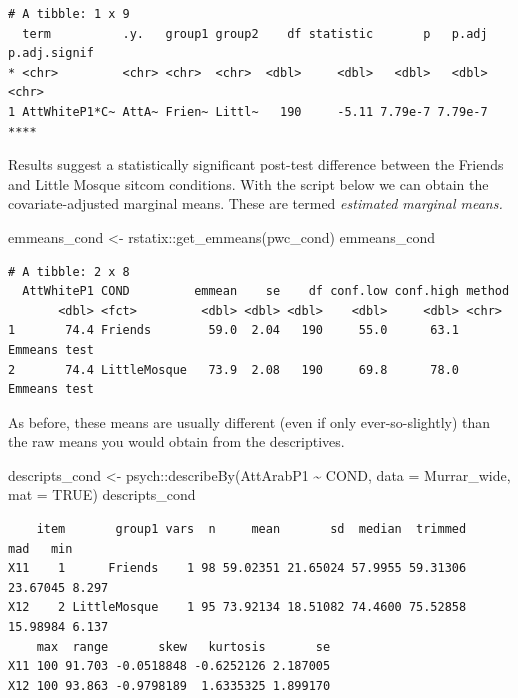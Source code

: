 \documentclass[
  11pt,
]{book}
\newenvironment{Shaded}{\begin{snugshade}}{\end{snugshade}}
\newcommand{\AttributeTok}[1]{\textcolor[rgb]{0.77,0.63,0.00}{#1}}
\newcommand{\ConstantTok}[1]{\textcolor[rgb]{0.00,0.00,0.00}{#1}}
\newcommand{\FunctionTok}[1]{\textcolor[rgb]{0.00,0.00,0.00}{#1}}
\newcommand{\NormalTok}[1]{#1}
\newcommand{\OtherTok}[1]{\textcolor[rgb]{0.56,0.35,0.01}{#1}}
\newcommand{\SpecialCharTok}[1]{\textcolor[rgb]{0.00,0.00,0.00}{#1}}
\begin{document}
\begin{verbatim}
# A tibble: 1 x 9
  term          .y.   group1 group2    df statistic       p   p.adj p.adj.signif
* <chr>         <chr> <chr>  <chr>  <dbl>     <dbl>   <dbl>   <dbl> <chr>       
1 AttWhiteP1*C~ AttA~ Frien~ Littl~   190     -5.11 7.79e-7 7.79e-7 ****        
\end{verbatim}

Results suggest a statistically significant post-test difference between the Friends and Little Mosque sitcom conditions.
With the script below we can obtain the covariate-adjusted marginal means. These are termed \emph{estimated marginal means.}

\begin{Shaded}
\begin{Highlighting}[]
\NormalTok{emmeans\_cond }\OtherTok{\textless{}{-}}\NormalTok{ rstatix}\SpecialCharTok{::}\FunctionTok{get\_emmeans}\NormalTok{(pwc\_cond)}
\NormalTok{emmeans\_cond}
\end{Highlighting}
\end{Shaded}

\begin{verbatim}
# A tibble: 2 x 8
  AttWhiteP1 COND         emmean    se    df conf.low conf.high method      
       <dbl> <fct>         <dbl> <dbl> <dbl>    <dbl>     <dbl> <chr>       
1       74.4 Friends        59.0  2.04   190     55.0      63.1 Emmeans test
2       74.4 LittleMosque   73.9  2.08   190     69.8      78.0 Emmeans test
\end{verbatim}

As before, these means are usually different (even if only ever-so-slightly) than the raw means you would obtain from the descriptives.

\begin{Shaded}
\begin{Highlighting}[]
\NormalTok{descripts\_cond }\OtherTok{\textless{}{-}}\NormalTok{ psych}\SpecialCharTok{::}\FunctionTok{describeBy}\NormalTok{(AttArabP1 }\SpecialCharTok{\textasciitilde{}}\NormalTok{ COND, }\AttributeTok{data =}\NormalTok{ Murrar\_wide,}
    \AttributeTok{mat =} \ConstantTok{TRUE}\NormalTok{)}
\NormalTok{descripts\_cond}
\end{Highlighting}
\end{Shaded}

\begin{verbatim}
    item       group1 vars  n     mean       sd  median  trimmed      mad   min
X11    1      Friends    1 98 59.02351 21.65024 57.9955 59.31306 23.67045 8.297
X12    2 LittleMosque    1 95 73.92134 18.51082 74.4600 75.52858 15.98984 6.137
    max  range       skew   kurtosis       se
X11 100 91.703 -0.0518848 -0.6252126 2.187005
X12 100 93.863 -0.9798189  1.6335325 1.899170
\end{verbatim}
\end{document}
